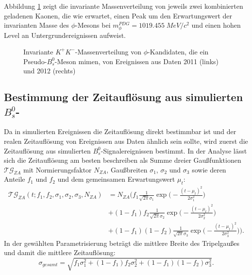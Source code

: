 \documentclass{article}
\begin{document}

Abbildung \ref{fig:promptphimass} zeigt die invariante Massenverteilung von jeweils zwei kombinierten geladenen Kaonen, die wie erwartet, einen Peak um den Erwartungswert der invarianten Masse des $\phi$-Mesons bei $m^{PDG}_{\phi}=1019.455\;MeV/c^2$ und einen hohen Level an Untergrundereignissen aufweist. %
  

\begin{figure}[h!]
\caption{Invariante $K^+K^-$-Massenverteilung von $\phi$-Kandidaten, die ein Pseudo-$B_s^0$-Meson mimen, von Ereignissen aus Daten 2011 (links) und 2012 (rechts)}
\label{fig:promptphimass}
\end{figure} 
\vspace{2cm}

\subsection[Bestimmung der Zeitauflösung aus simulierten $B_s^0$-Signalereignissen]{Bestimmung der Zeitauflösung aus simulierten $B_s^0$- \\ }
\label{ch:tres}
Da in simulierten Ereignissen die Zeitauflösung direkt bestimmbar ist und der realen Zeitauflösung von Ereignissen aus Daten ähnlich sein sollte, wird zuerst die Zeitauflösung aus simulierten $B_s^0$-Signalereignissen bestimmt.
In der Analyse lässt sich die Zeitauflösung am besten beschreiben als Summe dreier Gaußfunktionen $\mathcal{TG}_{ZA}$ mit Normierungsfaktor $N_{ZA}$, Gaußbreiten $\sigma_1$, $\sigma_2$ und $\sigma_3$ sowie deren Anteile $f_1$ und $f_2$ und dem gemeinsamen Erwartungswert $\mu_t$:
\begin{align*}
\mathcal{TG}_{ZA}(t;f_1,f_2,\sigma_1,\sigma_2,\sigma_3,N_{ZA})&=N_{ZA} \Big( f_1 \frac{1}{\sqrt{2 \pi} \sigma_1} \exp \big( -{\frac{(t-\mu_t)^2}{2 \sigma_1^2}} \big) \\&+  (1-f_1) f_2  \frac{1}{\sqrt{2 \pi} \sigma_2} \exp \big(- {\frac{(t-\mu_t)^2}{2 \sigma_2^2}} \big)\\ &+ (1- f_1)(1-f_2) \frac{1}{\sqrt{2 \pi} \sigma_3} \exp \big(- {\frac{(t-\mu_t)^2}{2 \sigma_3^2}} \big) \Big).  
\end{align*}
In der gewählten Parametrisierung beträgt die mittlere Breite des Tripelgaußes und damit die mittlere Zeitauflösung: 
\[\sigma_{gesamt} = \sqrt{f_1 \sigma_1^2+ (1-f_1)f_2\sigma_2^2+  (1-f_1)(1-f_2)\sigma_3^2}.\]
\end{document}

